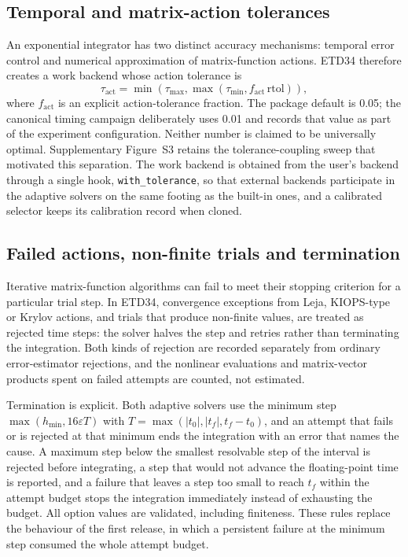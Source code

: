 \subsection{Temporal and matrix-action tolerances}

An exponential integrator has two distinct accuracy mechanisms: temporal error
control and numerical approximation of matrix-function actions.  ETD34
therefore creates a work backend whose action tolerance is
\begin{equation}
 \tau_{\mathrm{act}}
 =\min(\tau_{\max},\max(\tau_{\min},f_{\mathrm{act}}\,\mathrm{rtol})),
 \label{eq:actiontol}
\end{equation}
where $f_{\mathrm{act}}$ is an explicit action-tolerance fraction.  The package
default is 0.05; the canonical timing campaign deliberately uses 0.01 and
records that value as part of the experiment configuration.  Neither number is
claimed to be universally optimal.  Supplementary Figure~S3 retains the
tolerance-coupling sweep that motivated this separation.  The work backend is
obtained from the user's backend through a single hook, \texttt{with\_tolerance},
so that external backends participate in the adaptive solvers on the same
footing as the built-in ones, and a calibrated selector keeps its calibration
record when cloned.

\subsection{Failed actions, non-finite trials and termination}

Iterative matrix-function algorithms can fail to meet their stopping criterion
for a particular trial step.  In ETD34, convergence exceptions from Leja,
KIOPS-type or Krylov actions, and trials that produce non-finite values, are
treated as rejected time steps: the solver halves the step and retries rather
than terminating the integration.  Both kinds of rejection are recorded
separately from ordinary error-estimator rejections, and the nonlinear
evaluations and matrix-vector products spent on failed attempts are counted,
not estimated.

Termination is explicit.  Both adaptive solvers use the minimum step
$\max(h_{\min},16\varepsilon T)$ with $T=\max(|t_0|,|t_f|,t_f-t_0)$, and an
attempt that fails or is rejected at that minimum ends the integration with an
error that names the cause.  A maximum step below the smallest resolvable step
of the interval is rejected before integrating, a step that would not advance
the floating-point time is reported, and a failure that leaves a step too
small to reach $t_f$ within the attempt budget stops the integration
immediately instead of exhausting the budget.  All option values are validated,
including finiteness.  These rules replace the behaviour of the first release,
in which a persistent failure at the minimum step consumed the whole attempt
budget.

